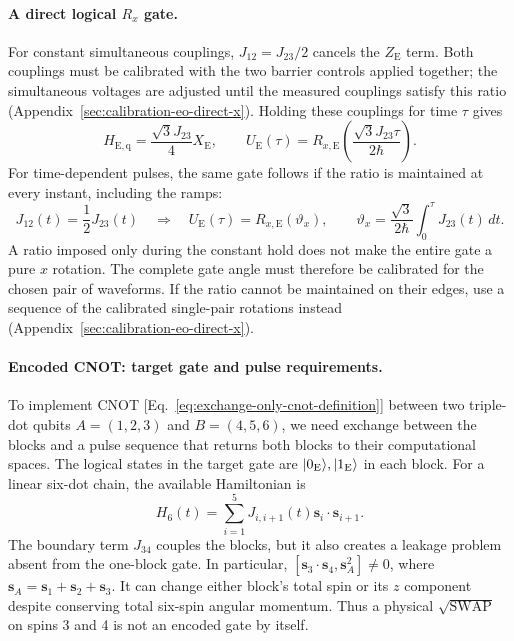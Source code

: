 \paragraph{A direct logical \texorpdfstring{$R_x$}{Rx} gate.}
For constant simultaneous couplings, $J_{12}=J_{23}/2$ cancels the
$Z_{\mathrm E}$ term. Both couplings must be calibrated with the
two barrier controls applied together; the simultaneous voltages
are adjusted until the measured couplings satisfy this ratio
(Appendix~\ref{sec:calibration-eo-direct-x}). Holding these couplings
for time $\tau$ gives
\begin{equation}
 H_{\mathrm{E,q}}=\frac{\sqrt3 J_{23}}{4}X_{\mathrm E},\qquad
 U_{\mathrm E}(\tau)
    =R_{x,\mathrm E}\!\left(\frac{\sqrt3 J_{23}\tau}{2\hbar}\right).
 \label{eq:exchange-only-direct-x-gate}
\end{equation}
For time-dependent pulses, the same gate follows if the ratio is
maintained at every instant, including the ramps:
\begin{equation}
 J_{12}(t)=\frac12J_{23}(t)
 \quad\Longrightarrow\quad
 U_{\mathrm E}(\tau)=R_{x,\mathrm E}(\vartheta_x),\qquad
 \vartheta_x=\frac{\sqrt3}{2\hbar}\int_0^\tau J_{23}(t)\,dt.
 \label{eq:exchange-only-shaped-x-gate}
\end{equation}
A ratio imposed only during the constant hold does not make the
entire gate a pure $x$ rotation. The complete gate angle must
therefore be calibrated for the chosen pair of waveforms. If the
ratio cannot be maintained on their edges, use a sequence of the
calibrated single-pair rotations instead
(Appendix~\ref{sec:calibration-eo-direct-x}).

\paragraph{Encoded CNOT: target gate and pulse requirements.}
To implement CNOT [Eq.~\eqref{eq:exchange-only-cnot-definition}]
between two triple-dot qubits $A=(1,2,3)$ and $B=(4,5,6)$, we need
exchange between the blocks and a pulse sequence that returns both
blocks to their computational spaces. The logical states in the
target gate are $\lvert 0_{\mathrm E}\rangle,\lvert 1_{\mathrm E}\rangle$ in each block.
For a linear six-dot chain, the available Hamiltonian is
\begin{equation}
 H_6(t)=\sum_{i=1}^{5}J_{i,i+1}(t)
                 \mathbf{s}_i\cdot\mathbf{s}_{i+1}.
 \label{eq:six-spin-exchange}
\end{equation}
The boundary term $J_{34}$ couples the blocks, but it also creates
a leakage problem absent from the one-block gate.
In particular,
$[\mathbf{s}_3\cdot\mathbf{s}_4,\mathbf{s}_A^2]\ne0$, where
$\mathbf{s}_A=\mathbf{s}_1+\mathbf{s}_2+\mathbf{s}_3$.
It can change either block's total spin or its $z$ component despite
conserving total six-spin angular momentum.
Thus a physical $\sqrt{\mathrm{SWAP}}$ on spins 3 and 4 is not an
encoded gate by itself.

